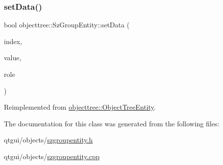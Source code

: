 \subsubsection{\texorpdfstring{setData()}{setData()}}
{\footnotesize\ttfamily bool objecttree\+::\+Sz\+Group\+Entity\+::set\+Data (\begin{DoxyParamCaption}\item[{const Q\+Model\+Index \&}]{index,  }\item[{const Q\+Variant \&}]{value,  }\item[{int}]{role }\end{DoxyParamCaption})\hspace{0.3cm}{\ttfamily [virtual]}}



Reimplemented from \mbox{\hyperlink{classobjecttree_1_1_object_tree_entity_ab6742194e637093cb1571998bee88ff5}{objecttree\+::\+Object\+Tree\+Entity}}.



The documentation for this class was generated from the following files\+:\begin{DoxyCompactItemize}
\item 
qtgui/objects/\mbox{\hyperlink{szgroupentity_8h}{szgroupentity.\+h}}\item 
qtgui/objects/\mbox{\hyperlink{szgroupentity_8cpp}{szgroupentity.\+cpp}}\end{DoxyCompactItemize}
